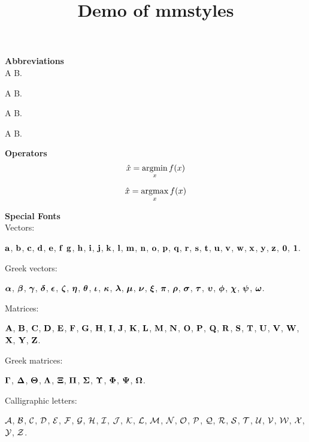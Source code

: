 \documentclass[a4paper,11pt]{article}
\title{\bf Demo of mmstyles}
\author{}
\date{}
\begin{document}
	
\maketitle	

\noindent\textbf{Abbreviations} \\

A \ie B.

A \eg B.

A \wrt B.

A \etal B.

\vspace{20pt}


\noindent \textbf{Operators} \\

\[
\hat{x} = \argmin_x f(x)
\]

\[
\hat{x} = \argmax_x f(x)
\]


\vspace{20pt}

\noindent \textbf{Special Fonts} \\

Vectors:

$\va$, $\vb$, $\vc$, $\vd$, $\ve$, $\vf$
$\vg$, $\vh$, $\vi$, $\vj$, $\vk$, $\vl$,
$\vm$, $\vn$, $\vo$, $\vp$, $\vq$, $\vr$,
$\vs$, $\vt$, $\vu$, $\vv$, $\vw$, $\vx$, 
$\vy$, $\vz$, $\vzero$, $\vone$.

Greek vectors:

$\valpha$, $\vbeta$, $\vgamma$, $\vdelta$,
$\vepsilon$, $\vzeta$, $\veta$, $\vtheta$,
$\viota$, $\vkappa$, $\vlambda$, 
$\vmu$, $\vnu$, $\vxi$, $\vpi$,
$\vrho$, $\vsigma$, $\vtau$, $\vupsilon$,
$\vphi$, $\vchi$, $\vpsi$, $\vomega$.

Matrices:

$\mA$, $\mB$, $\mC$, $\mD$, $\mE$, $\mF$,
$\mG$, $\mH$, $\mI$, $\mJ$, $\mK$, $\mL$,
$\mM$, $\mN$, $\mO$, $\mP$, $\mQ$, $\mR$,
$\mS$, $\mT$, $\mU$, $\mV$, $\mW$, $\mX$,
$\mY$, $\mZ$.

Greek matrices:

$\mGamma$, $\mDelta$, $\mTheta$, $\mLambda$,
$\mXi$, $\mPi$, $\mSigma$, $\mUpsilon$,
$\mPhi$, $\mPsi$, $\mOmega$.

Calligraphic letters:

$\cA$, $\cB$, $\cC$, $\cD$, $\cE$, $\cF$,
$\cG$, $\cH$, $\cI$, $\cJ$, $\cK$, $\cL$,
$\cM$, $\cN$, $\cO$, $\cP$, $\cQ$, $\cR$,
$\cS$, $\cT$, $\cU$, $\cV$, $\cW$, $\cX$,
$\cY$, $\cZ$.

	
\end{document}
